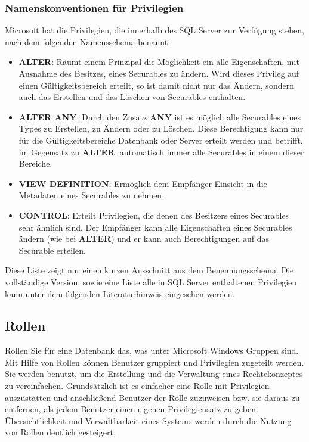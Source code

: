         \subsubsection{Namenskonventionen für Privilegien}
          Microsoft hat die Privilegien, die innerhalb des SQL Server zur
          Verfügung stehen, nach dem folgenden Namensschema benannt:
          \begin{itemize}
            \item \textbf{ALTER}: Räumt einem Prinzipal die Möglichkeit ein alle
            Eigenschaften, mit Ausnahme des Besitzes, eines Securables zu
            ändern. Wird dieses Privileg auf einen Gültigkeitsbereich erteilt,
            so ist damit nicht nur das Ändern, sondern auch das Erstellen und
            das Löschen von Securables enthalten.
            \item \textbf{ALTER ANY}: Durch den Zusatz \textbf{ANY} ist es
            möglich alle Securables eines Types zu Erstellen, zu Ändern oder zu
            Löschen. Diese Berechtigung kann nur für die Gültigkeitsbereiche
            Datenbank oder Server erteilt werden und betrifft, im Gegensatz zu
            \textbf{ALTER}, automatisch immer alle Securables in einem dieser
            Bereiche.
            \item \textbf{VIEW DEFINITION}: Ermöglich dem Empfänger Einsicht in
            die Metadaten eines Securables zu nehmen.
            \item \textbf{CONTROL}: Erteilt Privilegien, die denen des Besitzers
            eines Securables sehr ähnlich sind. Der Empfänger kann alle
            Eigenschaften eines Securables ändern (wie bei \textbf{ALTER}) und
            er kann auch Berechtigungen auf das Securable erteilen.
          \end{itemize}
          Diese Liste zeigt nur einen kurzen Ausschnitt aus dem
          Benennungsschema. Die vollständige Version, sowie eine Liste alle in
          SQL Server enthaltenen Privilegien kann unter dem folgenden
          Literaturhinweis eingesehen werden.
          \begin{literaturinternet}
            \item \cite{ms191291}
          \end{literaturinternet}
      \subsection{Rollen}
        Rollen Sie für eine Datenbank das, was unter Microsoft Windows Gruppen
        sind. Mit Hilfe von Rollen können Benutzer gruppiert und Privilegien
        zugeteilt werden. Sie werden benutzt, um die Erstellung und die
        Verwaltung eines Rechtekonzeptes zu vereinfachen. Grundsätzlich ist es
        einfacher eine Rolle mit Privilegien auszustatten und anschließend
        Benutzer der Rolle zuzuweisen bzw. sie daraus zu entfernen, als jedem
        Benutzer einen eigenen Privilegiensatz zu geben. Übersichtlichkeit
        und Verwaltbarkeit eines Systems werden durch die Nutzung von Rollen
        deutlich gesteigert.
        
